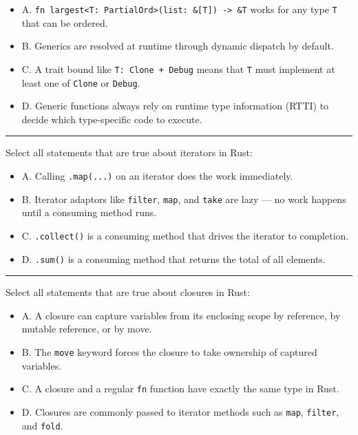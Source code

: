 \documentclass[
  11pt,
]{article}
\providecommand{\tightlist}{%
  \setlength{\itemsep}{0pt}\setlength{\parskip}{0pt}}
\begin{document}
\begin{itemize}
\tightlist
\item[$\square$]
  A.
  \texttt{fn\ largest\textless{}T:\ PartialOrd\textgreater{}(list:\ \&{[}T{]})\ -\textgreater{}\ \&T}
  works for any type \texttt{T} that can be ordered.
\item[$\square$]
  B. Generics are resolved at runtime through dynamic dispatch by
  default.
\item[$\square$]
  C. A trait bound like \texttt{T:\ Clone\ +\ Debug} means that
  \texttt{T} must implement at least one of \texttt{Clone} or
  \texttt{Debug}.
\item[$\square$]
  D. Generic functions always rely on runtime type information (RTTI) to
  decide which type-specific code to execute.
\end{itemize}

\begin{center}\rule{0.5\linewidth}{0.5pt}\end{center}

Select all statements that are true about iterators in Rust:

\begin{itemize}
\tightlist
\item[$\square$]
  A. Calling \texttt{.map(...)} on an iterator does the work
  immediately.
\item[$\square$]
  B. Iterator adaptors like \texttt{filter}, \texttt{map}, and
  \texttt{take} are lazy --- no work happens until a consuming method
  runs.
\item[$\square$]
  C. \texttt{.collect()} is a consuming method that drives the iterator
  to completion.
\item[$\square$]
  D. \texttt{.sum()} is a consuming method that returns the total of all
  elements.
\end{itemize}

\begin{center}\rule{0.5\linewidth}{0.5pt}\end{center}

Select all statements that are true about closures in Rust:

\begin{itemize}
\tightlist
\item[$\square$]
  A. A closure can capture variables from its enclosing scope by
  reference, by mutable reference, or by move.
\item[$\square$]
  B. The \texttt{move} keyword forces the closure to take ownership of
  captured variables.
\item[$\square$]
  C. A closure and a regular \texttt{fn} function have exactly the same
  type in Rust.
\item[$\square$]
  D. Closures are commonly passed to iterator methods such as
  \texttt{map}, \texttt{filter}, and \texttt{fold}.
\end{itemize}
\end{document}
